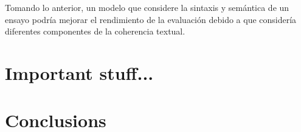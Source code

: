 \documentclass[12pt]{diicc}
\begin{document}
Tomando lo anterior, un modelo que considere la sintaxis y semántica de un ensayo podría mejorar el rendimiento de la evaluación debido a que considería diferentes componentes de la coherencia textual.
% 
\chapter{Important stuff...}\label{chap:contributions}

%
% 
\chapter{Conclusions}\label{chap:conclusion}
\end{document}
